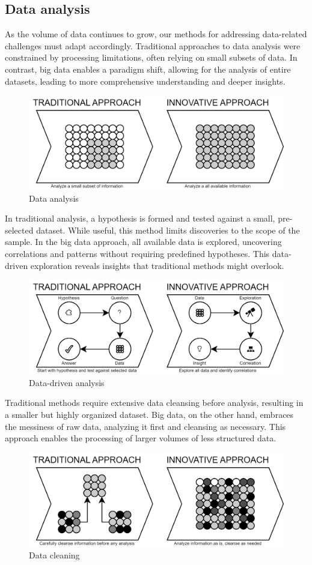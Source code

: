 \subsection{Data analysis}
As the volume of data continues to grow, our methods for addressing data-related challenges must adapt accordingly. 
Traditional approaches to data analysis were constrained by processing limitations, often relying on small subsets of data. 
In contrast, big data enables a paradigm shift, allowing for the analysis of entire datasets, leading to more comprehensive understanding and deeper insights.
\begin{figure}[H]
    \centering
    \includegraphics[width=0.75\linewidth]{images/in.png}
    \caption{Data analysis}
\end{figure}
\noindent In traditional analysis, a hypothesis is formed and tested against a small, pre-selected dataset.
While useful, this method limits discoveries to the scope of the sample.
In the big data approach, all available data is explored, uncovering correlations and patterns without requiring predefined hypotheses. 
This data-driven exploration reveals insights that traditional methods might overlook.
\begin{figure}[H]
    \centering
    \includegraphics[width=0.75\linewidth]{images/in1.png}
    \caption{Data-driven analysis}
\end{figure}
\noindent Traditional methods require extensive data cleansing before analysis, resulting in a smaller but highly organized dataset.
Big data, on the other hand, embraces the messiness of raw data, analyzing it first and cleansing as necessary. 
This approach enables the processing of larger volumes of less structured data.
\begin{figure}[H]
    \centering
    \includegraphics[width=0.75\linewidth]{images/in2.png}
    \caption{Data cleaning}
\end{figure}
